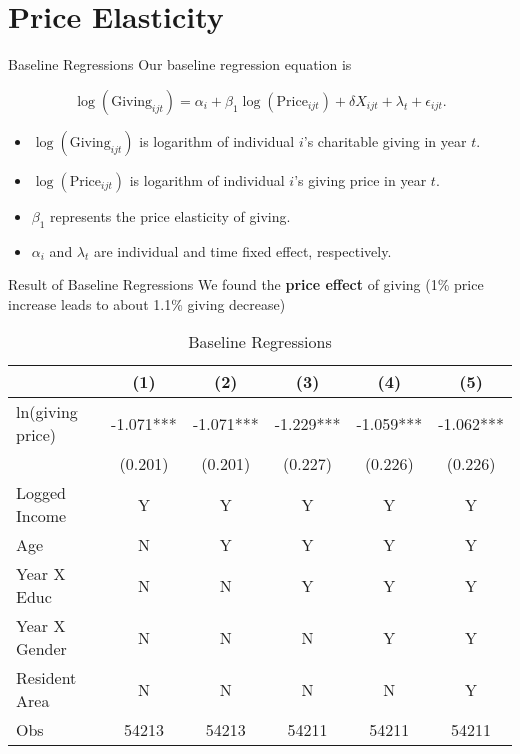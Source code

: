\documentclass[
  ignorenonframetext,
]{beamer}
\providecommand{\tightlist}{%
  \setlength{\itemsep}{0pt}\setlength{\parskip}{0pt}}
\begin{document}
\hypertarget{price-elasticity}{%
\section{Price Elasticity}\label{price-elasticity}}

\begin{frame}{Baseline Regressions}
\protect\hypertarget{baseline-regressions}{}
Our baseline regression equation is

\[
    \log(\text{Giving}_{ijt}) = 
    \alpha_i + \beta_1 \log(\text{Price}_{ijt}) + \delta X_{ijt} + \lambda_t + \epsilon_{ijt}.
\]

\begin{itemize}
\tightlist
\item
  \(\log(\text{Giving}_{ijt})\) is logarithm of individual \(i\)'s
  charitable giving in year \(t\).
\item
  \(\log(\text{Price}_{ijt})\) is logarithm of individual \(i\)'s giving
  price in year \(t\).
\item
  \(\beta_1\) represents the price elasticity of giving.
\item
  \(\alpha_i\) and \(\lambda_t\) are individual and time fixed effect,
  respectively.
\end{itemize}
\end{frame}

\begin{frame}{Result of Baseline Regressions}
\protect\hypertarget{result-of-baseline-regressions}{}
We found the \textbf{price effect} of giving (1\% price increase leads
to about 1.1\% giving decrease)

\begin{table}

\caption{\label{tab:kableEstimateElasticity}Baseline Regressions}
\centering
\fontsize{9}{11}\selectfont
\begin{tabular}[t]{lccccc}
\toprule
 & (1) & (2) & (3) & (4) & (5)\\
\midrule
ln(giving price) & -1.071*** & -1.071*** & -1.229*** & -1.059*** & -1.062***\\
 & (0.201) & (0.201) & (0.227) & (0.226) & (0.226)\\
Logged Income & Y & Y & Y & Y & Y\\
Age & N & Y & Y & Y & Y\\
Year X Educ & N & N & Y & Y & Y\\
Year X Gender & N & N & N & Y & Y\\
Resident Area & N & N & N & N & Y\\
Obs & 54213 & 54213 & 54211 & 54211 & 54211\\
\bottomrule
\end{tabular}
\end{table}
\end{frame}
\end{document}
